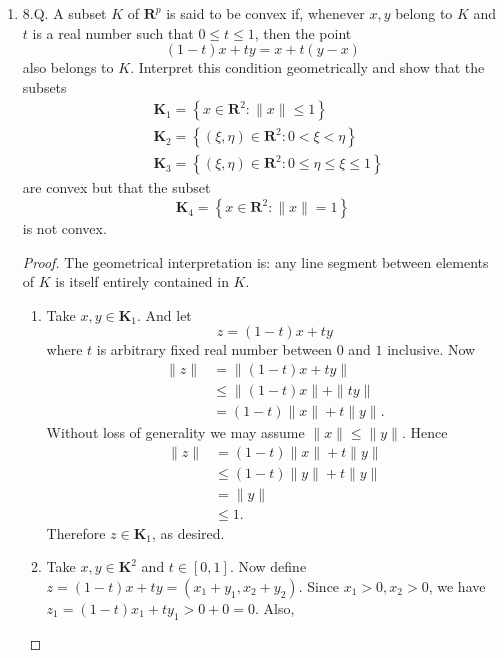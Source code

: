 \begin{enumerate}
\begin{proof}
	The second statement is not true in general. 

	Consider $x,y \in \mathbb{R}^3$ where \[
		x = (1,1,1), y = (1,1,1)
	.\] 
	Now $x  \cdot y = 1\times 1 + 1\times 1 + 1\times 1 = 3$ and $\|x\|_{\infty }\|y\|_{\infty } = 1 \times  1 = 1$. We have a counterexample for the statement now.
\end{proof}

\item 8.Q. A subset $K$ of $\boldsymbol{R}^p$ is said to be convex if, whenever $x, y$ belong to $K$ and $t$ is a real number such that $0 \leq t \leq 1$, then the point
\[
(1-t) x+t y=x+t(y-x)
\]
also belongs to $K$. Interpret this condition geometrically and show that the subsets
\[
\begin{aligned}
&\boldsymbol{K}_1=\left\{x \in \boldsymbol{R}^2:\|x\| \leq 1\right\} \\
&\boldsymbol{K}_2=\left\{(\xi, \eta) \in \boldsymbol{R}^2: 0<\xi<\eta\right\} \\
&\boldsymbol{K}_3=\left\{(\xi, \eta) \in \boldsymbol{R}^2: 0 \leq \eta \leq \xi \leq 1\right\}
\end{aligned}
\]
are convex but that the subset
\[
\boldsymbol{K}_4=\left\{x \in \boldsymbol{R}^2:\|x\|=1\right\}
\]
is not convex.
\begin{proof}
	The geometrical interpretation is: any line segment between elements of $K $ is itself entirely contained in $K$. 
	\begin{enumerate}
		\item Take $x, y \in \mathbf{K}_1$. And let  \[
			z = (1-t)x + ty
		\] 
		where $t$ is arbitrary fixed real number between $0$ and $1$ inclusive. Now
		\begin{align*}
			\|z\| &= \|(1-t)x + ty\| \\
			&\le  \|(1-t)x \|+ \|ty\|\\
			&=  (1-t)\|x \|+ t\|y\|
		.\end{align*}
		Without loss of generality we may assume $\|x\|\le \|y\|$. Hence 
		\begin{align*}
			\|z\|
			&=  (1-t)\|x \|+ t\|y\|\\
			&\le (1-t)\|y\| + t \|y\|\\
			&= \|y\|\\
			&\le 1
		.\end{align*}
		Therefore $z \in \mathbf{K}_1$, as desired.
	\item Take $x, y \in \mathbf{K}^2$ and $t \in [0,1]$. Now define  $z = (1-t)x + ty = (x_1 + y_1, x_2 + y_2)$.
	Since $x_1>0, x_2>0$, we have $z_1 = (1-t)x_1+ty_1 > 0+0 = 0$. Also,

\end{enumerate}
\end{proof}
\end{enumerate}
